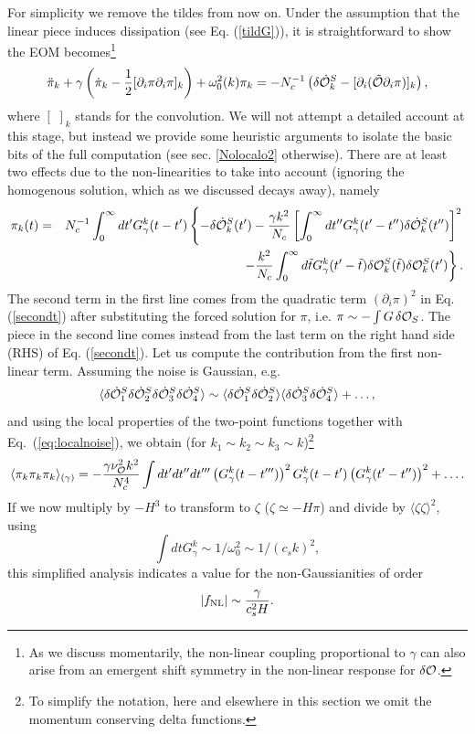 \documentclass[11pt,amsmath,floats,floatfix,nofootinbib,secnumarabic, superscriptaddress, tightenlines]{revtex4}
\newcommand{\beq}{\begin{equation}}
\newcommand{\eeq}{\end{equation}}
\newcommand{\bea}{\begin{eqnarray}}
\newcommand{\eea}{\end{eqnarray}}
\newcommand{\nn}{\nonumber}
\newcommand{\calo}{{\cal O}}
\begin{document}
{For simplicity we remove the tildes from now on. Under the assumption that the linear piece induces dissipation (see Eq. (\ref{tildG})), it is straightforward to
show the EOM becomes\footnote{As we discuss momentarily, the non-linear coupling
proportional to $\gamma$ can also arise from an emergent shift symmetry in the non-linear response for $\delta\calo$.}
\beq
\label{secondt}
\ddot\pi_k + \gamma \left(\dot\pi_k - \frac{1}{2}[\partial_i \pi\partial_i \pi]_k\right) + \omega_0^2(k)\pi_k = -N^{-1}_c\left(\delta\dot{\calo}^S_k -[\partial_i(\tilde\calo\partial_i\pi)]_k\right),
\eeq where $[\,\,]_k$ stands for the convolution. We will not attempt a detailed account at this stage, but instead we provide some heuristic arguments to isolate the basic bits of the full computation (see sec. \ref{Nolocalo2} otherwise). There are at least two effects due to the non-linearities to take into account (ignoring the homogenous solution, which as we discussed decays away), namely
\bea
\pi_k(t) &=& N^{-1}_c \int_0^\infty dt' G^k_\gamma(t-t')\left\{-\delta\dot{\calo}^S_k (t') - \frac{\gamma k^2}{N_c} \left[\int_0^\infty dt'' G^k_\gamma(t'-t'')\delta\dot{\calo}^S_k(t'')\right]^2\right. \nn \\
&& \left. -\frac{k^2}{N_c} \int_0^\infty d\tilde t G^k_\gamma(t'-\tilde t)\delta\calo^S_k (\tilde t) \delta\calo^S_k(t') \right\}. \label{eompig}
\eea
The second term in the first line comes from the quadratic term $(\partial_i\pi)^2$ in Eq. (\ref{secondt}) after substituting
the forced solution for $\pi$, i.e. $\pi\sim -\int G\, \delta{\cal O}_S$. The piece in the second line comes instead from the last term on the right hand side (RHS) of  Eq. (\ref{secondt}). Let us compute the contribution from the first non-linear term. Assuming the noise is Gaussian, e.g.
\beq \langle \delta\dot{\calo}^S_1\delta\dot{\calo}^S_2\delta\dot{\calo}^S_3\delta\dot{\calo}^S_4\rangle \sim \langle \delta\dot{\calo}^S_1\delta\dot{\calo}^S_2\rangle\langle\delta\dot{\calo}^S_3\delta\dot{\calo}^S_4\rangle+\ldots,\eeq and using the local properties of the two-point functions together with Eq.~(\ref{eq:localnoise}), we obtain (for $k_1\sim k_2\sim k_3\sim k$)\footnote{To simplify the notation, here and elsewhere in this section we omit the momentum conserving delta functions.}
\beq
\langle \pi_k \pi_k \pi_k \rangle_{(\gamma)} = -\frac{\gamma\nu_{\calo}^2 k^2}{N_c^4}\int dt'dt'' dt'''\left(G^k_\gamma(t-t''')\right)^2 G^k_\gamma(t-t')  \left(G^k_\gamma(t'-t'')\right)^2 + \ldots.
\eeq
If we now multiply by $-H^3$ to transform to $\zeta$ ($\zeta \simeq -H\pi$) and divide by $\langle \zeta\zeta\rangle^2$, using
 \beq
 \label{gkscal} \int dt G^k_\gamma  \sim 1/\omega_0^2 \sim 1/(c_sk)^2,
 \eeq
this simplified analysis indicates a value for the non-Gaussianities of order
\beq
\label{fnl1}
|f_{\rm NL}| \sim \frac{\gamma}{c_s^2H}.
\eeq

}
\end{document}
